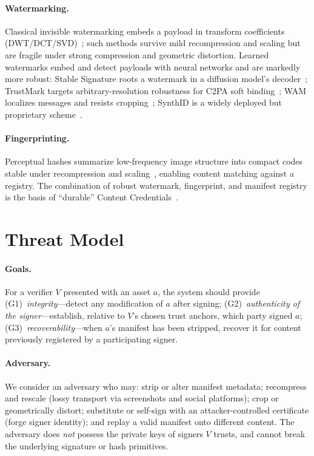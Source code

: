 \documentclass[11pt]{article}
\begin{document}
\paragraph{Watermarking.} Classical invisible watermarking embeds a payload in transform
coefficients (DWT/DCT/SVD)~\cite{cox2008watermarking,invisiblewatermark}; such methods
survive mild recompression and scaling but are fragile under strong compression and
geometric distortion. Learned watermarks embed and detect payloads with neural networks and
are markedly more robust: Stable Signature roots a watermark in a diffusion model's
decoder~\cite{fernandez2023stable}; TrustMark targets arbitrary-resolution robustness for
C2PA soft binding~\cite{bui2023trustmark}; WAM localizes messages and resists
cropping~\cite{sander2024wam}; SynthID is a widely deployed but proprietary
scheme~\cite{synthid,dathathri2024synthid}.

\paragraph{Fingerprinting.} Perceptual hashes summarize low-frequency image structure into
compact codes stable under recompression and scaling~\cite{zauner2010phash}, enabling
content matching against a registry. The combination of robust watermark, fingerprint, and
manifest registry is the basis of ``durable'' Content Credentials~\cite{durable-cc}.

\section{Threat Model}\label{sec:threat}
\paragraph{Goals.} For a verifier $V$ presented with an asset $a$, the system should provide
(G1)~\emph{integrity}---detect any modification of $a$ after signing; (G2)~\emph{authenticity
of the signer}---establish, relative to $V$'s chosen trust anchors, which party signed $a$;
(G3)~\emph{recoverability}---when $a$'s manifest has been stripped, recover it for content
previously registered by a participating signer.

\paragraph{Adversary.} We consider an adversary who may: strip or alter manifest metadata;
recompress and rescale (lossy transport via screenshots and social platforms); crop or
geometrically distort; substitute or self-sign with an attacker-controlled certificate
(forge signer identity); and replay a valid manifest onto different content. The adversary
does \emph{not} possess the private keys of signers $V$ trusts, and cannot break the
underlying signature or hash primitives.
\end{document}
